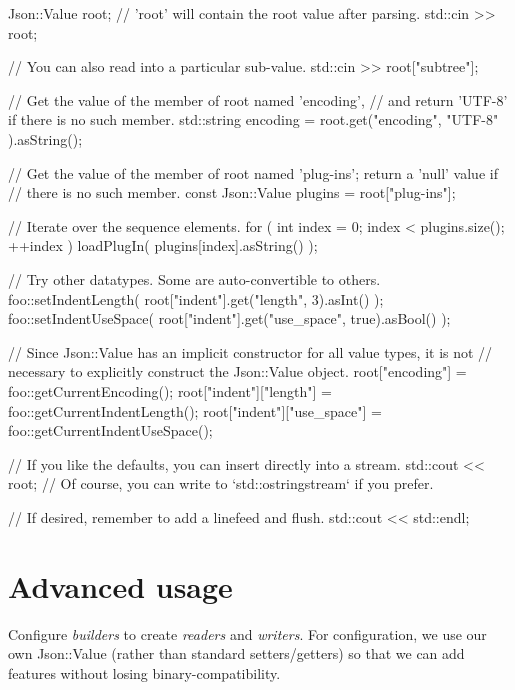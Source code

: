 \begin{DoxyCode}
Json::Value root;   \textcolor{comment}{// 'root' will contain the root value after parsing.}
std::cin >> root;

\textcolor{comment}{// You can also read into a particular sub-value.}
std::cin >> root[\textcolor{stringliteral}{"subtree"}];

\textcolor{comment}{// Get the value of the member of root named 'encoding',}
\textcolor{comment}{// and return 'UTF-8' if there is no such member.}
std::string encoding = root.get(\textcolor{stringliteral}{"encoding"}, \textcolor{stringliteral}{"UTF-8"} ).asString();

\textcolor{comment}{// Get the value of the member of root named 'plug-ins'; return a 'null' value if}
\textcolor{comment}{// there is no such member.}
\textcolor{keyword}{const} Json::Value plugins = root[\textcolor{stringliteral}{"plug-ins"}];

\textcolor{comment}{// Iterate over the sequence elements.}
\textcolor{keywordflow}{for} ( \textcolor{keywordtype}{int} index = 0; index < plugins.size(); ++index )
   loadPlugIn( plugins[index].asString() );
   
\textcolor{comment}{// Try other datatypes. Some are auto-convertible to others.}
foo::setIndentLength( root[\textcolor{stringliteral}{"indent"}].\textcolor{keyword}{get}(\textcolor{stringliteral}{"length"}, 3).asInt() );
foo::setIndentUseSpace( root[\textcolor{stringliteral}{"indent"}].\textcolor{keyword}{get}(\textcolor{stringliteral}{"use\_space"}, \textcolor{keyword}{true}).asBool() );

\textcolor{comment}{// Since Json::Value has an implicit constructor for all value types, it is not}
\textcolor{comment}{// necessary to explicitly construct the Json::Value object.}
root[\textcolor{stringliteral}{"encoding"}] = foo::getCurrentEncoding();
root[\textcolor{stringliteral}{"indent"}][\textcolor{stringliteral}{"length"}] = foo::getCurrentIndentLength();
root[\textcolor{stringliteral}{"indent"}][\textcolor{stringliteral}{"use\_space"}] = foo::getCurrentIndentUseSpace();

\textcolor{comment}{// If you like the defaults, you can insert directly into a stream.}
std::cout << root;
\textcolor{comment}{// Of course, you can write to `std::ostringstream` if you prefer.}

\textcolor{comment}{// If desired, remember to add a linefeed and flush.}
std::cout << std::endl;
\end{DoxyCode}
\hypertarget{index__advanced}{}\section{Advanced usage}\label{index__advanced}
Configure {\itshape builders} to create {\itshape readers} and {\itshape writers}. For configuration, we use our own {\ttfamily Json\+::\+Value} (rather than standard setters/getters) so that we can add features without losing binary-\/compatibility.


